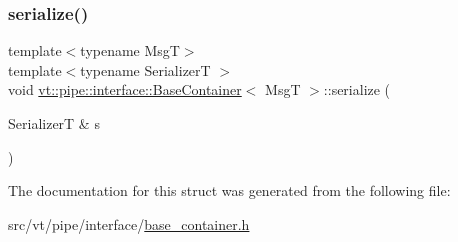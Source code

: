 \subsubsection{\texorpdfstring{serialize()}{serialize()}}
{\footnotesize\ttfamily template$<$typename MsgT$>$ \\
template$<$typename SerializerT $>$ \\
void \hyperlink{structvt_1_1pipe_1_1interface_1_1_base_container}{vt\+::pipe\+::interface\+::\+Base\+Container}$<$ MsgT $>$\+::serialize (\begin{DoxyParamCaption}\item[{SerializerT \&}]{s }\end{DoxyParamCaption})\hspace{0.3cm}{\ttfamily [inline]}}



The documentation for this struct was generated from the following file\+:\begin{DoxyCompactItemize}
\item 
src/vt/pipe/interface/\hyperlink{base__container_8h}{base\+\_\+container.\+h}\end{DoxyCompactItemize}

